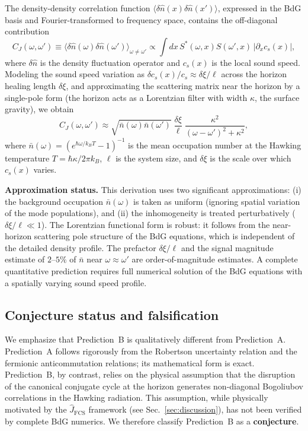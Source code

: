 \documentclass[aps,pra,preprint,groupedaddress,amsmath,amssymb,floatfix]{revtex4-2}
\begin{document}
The density-density correlation function $\langle \delta\hat{n}(x) \delta\hat{n}(x') \rangle$, expressed in the BdG basis and Fourier-transformed to frequency space, contains the off-diagonal contribution
\begin{equation}
C_J(\omega, \omega') \equiv \langle \delta\hat{n}(\omega) \delta\hat{n}(\omega') \rangle_{\omega \neq \omega'}
\propto \int dx\, S^*(\omega, x) S(\omega', x)\, |\partial_x c_s(x)|,
\end{equation}
where $\delta\hat{n}$ is the density fluctuation operator and $c_s(x)$ is the local sound speed. Modeling the sound speed variation as $\delta c_s(x)/c_s \approx \delta\xi/\ell$ across the horizon healing length $\delta\xi$, and approximating the scattering matrix near the horizon by a single-pole form (the horizon acts as a Lorentzian filter with width $\kappa$, the surface gravity), we obtain
\begin{equation}
\boxed{C_J(\omega, \omega') \approx \sqrt{\bar{n}(\omega) \bar{n}(\omega')}\;
\frac{\delta\xi}{\ell}\; \frac{\kappa^2}{(\omega - \omega')^2 + \kappa^2}}, \label{eq:predB}
\end{equation}
where $\bar{n}(\omega) = (e^{\hbar\omega/k_B T} - 1)^{-1}$ is the mean occupation number at the Hawking temperature $T = \hbar\kappa/2\pi k_B$, $\ell$ is the system size, and $\delta\xi$ is the scale over which $c_s(x)$ varies.

\textbf{Approximation status.} This derivation uses two significant approximations: (i) the background occupation $\bar{n}(\omega)$ is taken as uniform (ignoring spatial variation of the mode populations), and (ii) the inhomogeneity is treated perturbatively ($\delta\xi/\ell \ll 1$). The Lorentzian functional form is robust: it follows from the near-horizon scattering pole structure of the BdG equations, which is independent of the detailed density profile. The prefactor $\delta\xi/\ell$ and the signal magnitude estimate of $2$--$5\%$ of $\bar{n}$ near $\omega \approx \omega'$ are order-of-magnitude estimates. A complete quantitative prediction requires full numerical solution of the BdG equations with a spatially varying sound speed profile.

\subsection{Conjecture status and falsification}

We emphasize that Prediction~B is qualitatively different from Prediction~A. Prediction~A follows rigorously from the Robertson uncertainty relation and the fermionic anticommutation relations; its mathematical form is exact. Prediction~B, by contrast, relies on the physical assumption that the disruption of the canonical conjugate cycle at the horizon generates non-diagonal Bogoliubov correlations in the Hawking radiation. This assumption, while physically motivated by the $\hat{J}_{\text{FCS}}$ framework (see Sec.~\ref{sec:discussion}), has not been verified by complete BdG numerics. We therefore classify Prediction~B as a \textbf{conjecture}.
\end{document}
